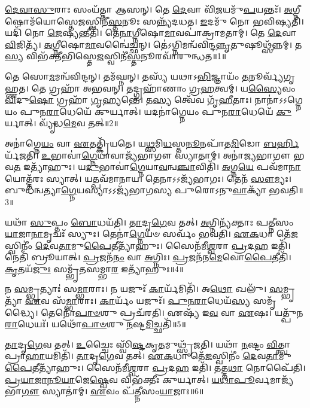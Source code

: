 \-\ul{𑌦𑍇}\-\-\ul{𑌵𑌾}\-\-\ul{𑌸𑍁}\-𑌰𑌾𑌃 𑌸𑌂𑌯᳴𑌤𑍍𑌤𑌾 𑌆𑌸𑌨𑍍।
𑌤𑍇 \ul{𑌦𑍇}\-𑌵𑌾 𑌵𑌿᳴\-\ul{𑌜}\-𑌯𑌮𑍁᳴\-\ul{𑌪}\-𑌯𑌨𑍍𑌤𑌃᳴।
\-\ul{𑌅}\-𑌗𑍍𑌨𑍀𑌷𑍋𑌮᳴𑌯𑍋𑌸𑍍𑌤𑍇\-\ul{𑌜}\-𑌸𑍍𑌵𑌿𑌨𑍀॑\-\ul{𑌸𑍍𑌤}\-𑌨𑍂𑌃 𑌸𑌨𑍍𑌨𑍍𑌯᳴𑌦𑌧𑌤।
\-\ul{𑌇}\-𑌦𑌮𑍁᳴ 𑌨𑍋 𑌭𑌵𑌿𑌷𑍍𑌯𑌤𑌿।
𑌯𑌦𑌿᳴ 𑌨𑍋 \ul{𑌜𑍇}\-𑌷𑍍𑌯𑌨𑍍𑌤𑍀𑌤𑌿᳴।
𑌤𑍇\-\ul{𑌨𑌾}\-𑌗𑍍𑌨𑍀𑌷𑍋\-\ul{𑌮𑌾}\-𑌵𑌪𑌾॑𑌕𑍍𑌰𑌾𑌮𑌤𑌾𑌮𑍍।
𑌤𑍇 \ul{𑌦𑍇}\-𑌵𑌾 \ul{𑌵𑌿}\-𑌜𑌿𑌤𑍍𑌯᳴।
\-\ul{𑌅}\-𑌗𑍍𑌨𑍀𑌷𑍋\-\ul{𑌮𑌾}\-𑌵𑌨𑍍𑌵𑍈॑𑌚𑍍𑌛𑌨𑍍।
𑌤𑍇॑𑌽𑌗𑍍𑌨𑌿𑌮𑌨𑍍𑌵᳴\-𑌵𑌿𑌨𑍍𑌦\-\ul{𑌨𑍍𑌨𑍃}\-𑌤𑍁𑌷𑍂𑌥𑍍𑌸᳴𑌨𑍍𑌨𑌮𑍍।
𑌤\-\ul{𑌸𑍍𑌯} 𑌵𑌿𑌭᳴𑌕𑍍𑌤𑍀𑌭𑌿𑌸𑍍𑌤𑍇\-\ul{𑌜}\-𑌸𑍍𑌵𑌿𑌨𑍀॑\-\ul{𑌸𑍍𑌤}\-𑌨𑍂\-𑌰𑌵𑌾᳴𑌰𑍁𑌨𑍍𑌧𑌤॥1॥

𑌤𑍇 𑌸𑍋\-\ul{𑌮}\-𑌮𑌨𑍍𑌵᳴𑌵𑌿𑌨𑍍𑌦𑌨𑍍।
𑌤𑌮᳴𑌘𑍍𑌨𑌨𑍍।
𑌤𑌸𑍍𑌯᳴ 𑌯𑌥𑌾\-𑌽\-\ul{𑌭𑌿}\-𑌜𑍍𑌞𑌾𑌯𑌂᳴ \ul{𑌤}\-𑌨𑍂𑌰𑍍𑌵𑍍𑌯᳴𑌗𑍃𑌹𑍍𑌣𑌤।
𑌤𑍇 𑌗𑍍𑌰𑌹𑌾᳴ 𑌅𑌭𑌵𑌨𑍍।
𑌤𑌦𑍍𑌗𑍍𑌰𑌹𑌾᳴𑌣𑌾𑌂 𑌗𑍍𑌰\-\ul{𑌹}\-𑌤𑍍𑌵𑌮𑍍।
𑌯\-\ul{𑌸𑍍𑌯𑍈}\-𑌵𑌂 \ul{𑌵𑌿}\-𑌦𑍁\-\ul{𑌷𑍋} 𑌗𑍍𑌰𑌹𑌾᳴ \ul{𑌗𑍃}\-𑌹𑍍𑌯𑌨𑍍𑌤𑍇॑।
𑌤\-\ul{𑌸𑍍𑌯} 𑌤𑍍𑌵𑍇᳴𑌵 𑌗𑍃᳴\-\ul{𑌹𑍀}\-𑌤𑌾𑌃।
𑌨𑌾𑌨𑌾॑\-𑌽𑌽𑌗𑍍𑌨𑍇𑌯𑌂 𑌪𑍁𑌨\-\ul{𑌰𑌾}\-𑌧𑍇𑌯𑍇᳴ 𑌕𑍁𑌰𑍍𑌯𑌾𑌤𑍍।
𑌯𑌦𑌨𑌾॑𑌗𑍍𑌨𑍇𑌯𑌂 𑌪𑍁𑌨\-\ul{𑌰𑌾}\-𑌧𑍇𑌯𑍇᳴ \ul{𑌕𑍁}\-𑌰𑍍𑌯𑌾𑌤𑍍।
𑌵𑍍𑌯𑍃᳴𑌦𑍍𑌧\-\ul{𑌮𑍇}\-𑌵 𑌤𑌤𑍍॥2॥

𑌅𑌨𑌾॑𑌗𑍍𑌨𑍇\-\ul{𑌯𑌂} 𑌵𑌾 \ul{𑌏}\-𑌤𑌤𑍍𑌕𑍍𑌰𑌿᳴𑌯𑌤𑍇।
𑌯\-\ul{𑌥𑍍𑌸}\-𑌮𑌿\-\ul{𑌧}\-𑌸𑍍𑌤\-\ul{𑌨𑍂}\-𑌨𑌪𑌾᳴𑌤\-\ul{𑌮𑌿}\-𑌡𑍋 \ul{𑌬}\-\-\ul{𑌰𑍍}\-\mbox{}𑌹𑌿𑌰𑍍𑌯᳴𑌜𑌤𑌿।
\-\ul{𑌉}\-𑌭𑌾𑌵𑌾॑\-\ul{𑌗𑍍𑌨𑍇}\-𑌯𑌾𑌵𑌾𑌜𑍍𑌯᳴𑌭𑌾𑌗𑍗 𑌸𑍍𑌯𑌾𑌤𑌾𑌮𑍍।
𑌅𑌨𑌾॑𑌜𑍍𑌯𑌭𑌾𑌗𑍗 𑌭𑌵\-\ul{𑌤} 𑌇𑌤𑍍𑌯𑌾᳴𑌹𑍁𑌃।
𑌯\-\ul{𑌦𑍁}\-𑌭𑌾𑌵𑌾॑\-\ul{𑌗𑍍𑌨𑍇}\-𑌯𑌾\-\ul{𑌵}\-𑌨𑍍𑌵\-\ul{𑌞𑍍𑌚𑌾}\-𑌵𑌿𑌤𑌿᳴।
\-\ul{𑌅}\-𑌗𑍍𑌨\-\ul{𑌯𑍇} 𑌪𑌵᳴𑌮𑌾\-\ul{𑌨𑌾}\-𑌯𑍋𑌤𑍍𑌤᳴𑌰𑌃 𑌸𑍍𑌯𑌾𑌤𑍍।
𑌯𑌤𑍍𑌪𑌵᳴𑌮𑌾𑌨𑌾𑌯।
𑌤𑍇𑌨𑌾𑌽𑌽𑌜𑍍𑌯᳴𑌭𑌾𑌗𑌃।
𑌤𑍇𑌨᳴ \ul{𑌸𑍗}\-𑌮𑍍𑌯𑌃।
𑌬𑍁𑌧᳴𑌨𑍍𑌵𑌤𑍍𑌯𑌾\-\ul{𑌗𑍍𑌨𑍇}\-𑌯𑌸𑍍𑌯𑌾𑌽𑌽𑌜𑍍𑌯᳴𑌭𑌾𑌗𑌸𑍍𑌯 𑌪𑍁𑌰𑍋\-𑌽𑌨𑍁\-\ul{𑌵𑌾}\-𑌕𑍍𑌯𑌾᳴ 𑌭𑌵𑌤𑌿॥3॥

𑌯𑌥𑌾᳴ \ul{𑌸𑍁}\-𑌪𑍍𑌤𑌂 \ul{𑌬𑍋}\-𑌧𑌯᳴𑌤𑌿।
\-\ul{𑌤𑌾}\-𑌦𑍃\-\ul{𑌗𑍇}\-𑌵 𑌤𑌤𑍍।
\-\ul{𑌅}\-𑌗𑍍𑌨𑌿𑌨𑍍𑌯᳴𑌕𑍍𑌤𑌾𑌃 𑌪𑌤𑍍𑌨𑍀𑌸𑌂\-\ul{𑌯𑌾}\-𑌜𑌾\-\ul{𑌨𑌾}\-𑌮𑍃𑌚𑌃᳴ 𑌸𑍍𑌯𑍁𑌃।
𑌤𑍇𑌨𑌾॑\-\ul{𑌗𑍍𑌨𑍇}\-𑌯𑍞 𑌸𑌰𑍍𑌵𑌂᳴ 𑌭𑌵𑌤𑌿।
\-\ul{𑌏}\-\-\ul{𑌕}\-𑌧𑌾 𑌤𑍇᳴\-\ul{𑌜}\-𑌸𑍍𑌵𑌿𑌨𑍀𑌂॑ \ul{𑌦𑍇}\-𑌵\-\ul{𑌤𑌾}\-𑌮𑍁\-\ul{𑌪𑍈}\-𑌤𑍀𑌤𑍍𑌯𑌾᳴𑌹𑍁𑌃।
𑌸𑍈𑌨᳴𑌮𑍀\-\ul{𑌶𑍍𑌵}\-𑌰𑌾 \ul{𑌪𑍍𑌰}\-𑌦\-\ul{𑌹} 𑌇𑌤𑌿᳴।
𑌨𑍇𑌤𑌿᳴ 𑌬𑍍𑌰𑍂𑌯𑌾𑌤𑍍।
\-\ul{𑌪𑍍𑌰}\-𑌜𑌨᳴\-\ul{𑌨𑌂} 𑌵𑌾 \ul{𑌅}\-𑌗𑍍𑌨𑌿𑌃।
\-\ul{𑌪𑍍𑌰}\-𑌜𑌨᳴𑌨\-\ul{𑌮𑍇}\-𑌵𑍋\-\ul{𑌪𑍈}\-𑌤𑍀𑌤𑌿᳴।
\-\ul{𑌕𑍃}\-𑌤𑌯᳴\-\ul{𑌜𑍁𑌃} 𑌸𑌮𑍍𑌭𑍃᳴𑌤𑌸𑌮𑍍𑌭𑌾\-\ul{𑌰} 𑌇𑌤𑍍𑌯𑌾᳴𑌹𑍁𑌃॥4॥

𑌨 \ul{𑌸}\-𑌮𑍍𑌭𑍃𑌤𑍍𑌯𑌾𑌃॑ 𑌸\-\ul{𑌮𑍍𑌭𑌾}\-𑌰𑌾𑌃।
𑌨 𑌯𑌜𑍁𑌃᳴ \ul{𑌕𑌾}\-𑌰𑍍𑌯᳴𑌮𑌿𑌤𑌿᳴।
𑌅\-\ul{𑌥𑍋} 𑌖𑌲𑍁᳴।
\-\ul{𑌸}\-𑌮𑍍𑌭𑍃𑌤𑍍𑌯𑌾᳴ \ul{𑌏}\-𑌵 𑌸᳴\-\ul{𑌮𑍍𑌭𑌾}\-𑌰𑌾𑌃।
\-\ul{𑌕𑌾}\-𑌰𑍍𑌯𑌂᳴ 𑌯𑌜𑍁𑌃᳴।
\-\ul{𑌪𑍁}\-\-\ul{𑌨}\-\-\ul{𑌰𑌾}\-𑌧𑍇𑌯᳴\-\ul{𑌸𑍍𑌯} 𑌸𑌮𑍃᳴𑌦𑍍𑌧𑍍𑌯𑍈।
𑌤𑍇𑌨𑍋᳴\-\ul{𑌪𑌾}\-\-\ul{𑍞}\-𑌶𑍁 𑌪𑍍𑌰𑌚᳴𑌰𑌤𑌿।
𑌏𑌷𑍍𑌯᳴ 𑌇\-\ul{𑌵} 𑌵𑌾 \ul{𑌏}\-𑌷𑌃।
𑌯𑌤𑍍𑌪𑍁᳴𑌨\-\ul{𑌰𑌾}\-𑌧𑍇𑌯𑌃᳴।
𑌯𑌥𑍋᳴\-\ul{𑌪𑌾}\-\-\ul{𑍞}\-𑌶𑍁 \ul{𑌨}\-𑌷𑍍𑌟\-\ul{𑌮𑌿}\-𑌚𑍍𑌛𑌤𑌿᳴॥5॥

\-\ul{𑌤𑌾}\-𑌦𑍃\-\ul{𑌗𑍇}\-𑌵 𑌤𑌤𑍍।
\-\ul{𑌉}\-𑌚𑍍𑌚𑍈𑌃 𑌸𑍍𑌵𑌿᳴\-\ul{𑌷𑍍𑌟}\-𑌕𑍃\-\ul{𑌤}\-𑌮𑍁𑌥𑍍𑌸𑍃᳴𑌜𑌤𑌿।
𑌯𑌥𑌾᳴ \ul{𑌨}\-𑌷𑍍𑌟𑌂 \ul{𑌵𑌿}\-𑌤𑍍𑌤𑍍𑌵𑌾 𑌪𑍍𑌰𑌾\-\ul{𑌹𑌾}\-𑌯𑌮𑌿𑌤𑌿᳴।
\-\ul{𑌤𑌾}\-𑌦𑍃\-\ul{𑌗𑍇}\-𑌵 𑌤𑌤𑍍।
\-\ul{𑌏}\-\-\ul{𑌕}\-𑌧𑌾 𑌤𑍇᳴\-\ul{𑌜}\-𑌸𑍍𑌵𑌿𑌨𑍀𑌂॑ \ul{𑌦𑍇}\-𑌵\-\ul{𑌤𑌾}\-𑌮𑍁\-\ul{𑌪𑍈}\-𑌤𑍀𑌤𑍍𑌯𑌾᳴𑌹𑍁𑌃।
𑌸𑍈𑌨᳴𑌮𑍀\-\ul{𑌶𑍍𑌵}\-𑌰𑌾 \ul{𑌪𑍍𑌰}\-𑌦\-\ul{𑌹} 𑌇𑌤𑌿᳴।
𑌤𑌤𑍍𑌤\-\ul{𑌥𑌾} 𑌨𑍋𑌪𑍈᳴𑌤𑌿।
\-\ul{𑌪𑍍𑌰}\-\-\ul{𑌯𑌾}\-\-\ul{𑌜𑌾}\-\-\ul{𑌨𑍂}\-\-\ul{𑌯𑌾}\-𑌜𑍇\-\ul{𑌷𑍍𑌵𑍇}\-𑌵 𑌵𑌿𑌭᳴𑌕𑍍𑌤𑍀𑌃 𑌕𑍁𑌰𑍍𑌯𑌾𑌤𑍍।
\-\ul{𑌯}\-\-\ul{𑌥𑌾}\-\-\ul{𑌪𑍂}\-𑌰𑍍𑌵𑌮𑌾𑌜𑍍𑌯᳴𑌭𑌾\-\ul{𑌗𑍗} 𑌸𑍍𑌯𑌾𑌤𑌾॑𑌮𑍍।
\-\ul{𑌏}\-𑌵𑌂 𑌪᳴𑌤𑍍𑌨𑍀𑌸𑌂\-\ul{𑌯𑌾}\-𑌜𑌾𑌃॥6॥

